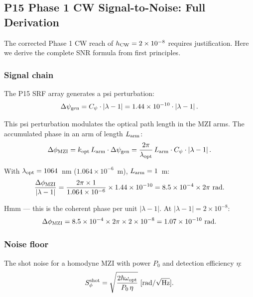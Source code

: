 \documentclass[11pt]{article}
\theoremstyle{definition}
\theoremstyle{remark}
\newcommand{\ee}[1]{\times 10^{#1}}
\newcommand{\abs}[1]{\left|#1\right|}
\begin{document}
\subsection{P15 Phase 1 CW Signal-to-Noise: Full Derivation}
\label{sec:p15-snr}

The corrected Phase 1 CW reach of $h_{\rm CW} = 2\ee{-8}$ requires
justification. Here we derive the complete SNR formula from first principles.

\subsubsection{Signal chain}

The P15 SRF array generates a psi perturbation:
\begin{equation}
\Delta\psi_{\rm gen} = C_\psi \cdot \abs{\lambda - 1}
= 1.44\ee{-10} \cdot \abs{\lambda - 1}.
\end{equation}

This psi perturbation modulates the optical path length in the MZI arms.
The accumulated phase in an arm of length $L_{\rm arm}$:
\begin{equation}
\Delta\phi_{\rm MZI} = k_{\rm opt}\,L_{\rm arm}\cdot\Delta\psi_{\rm gen}
= \frac{2\pi}{\lambda_{\rm opt}}\,L_{\rm arm}\cdot C_\psi \cdot \abs{\lambda - 1}.
\end{equation}

With $\lambda_{\rm opt} = 1064$~nm ($1.064\ee{-6}$~m), $L_{\rm arm} = 1$~m:
\begin{equation}
\frac{\Delta\phi_{\rm MZI}}{\abs{\lambda-1}} = \frac{2\pi \times 1}{1.064\ee{-6}}
\times 1.44\ee{-10} = 8.5\ee{-4} \times 2\pi~\text{rad}.
\end{equation}

Hmm --- this is the coherent phase per unit $\abs{\lambda-1}$. At $\abs{\lambda-1} = 2\ee{-8}$:
\begin{equation}
\Delta\phi_{\rm MZI} = 8.5\ee{-4} \times 2\pi \times 2\ee{-8}
= 1.07\ee{-10}~\text{rad}.
\end{equation}

\subsubsection{Noise floor}

The shot noise for a homodyne MZI with power $P_0$ and detection efficiency
$\eta$:
\begin{equation}
S_\phi^{\rm shot} = \sqrt{\frac{2\hbar\omega_{\rm opt}}{P_0\,\eta}}
~[\text{rad}/\sqrt{\text{Hz}}].
\end{equation}
\end{document}
